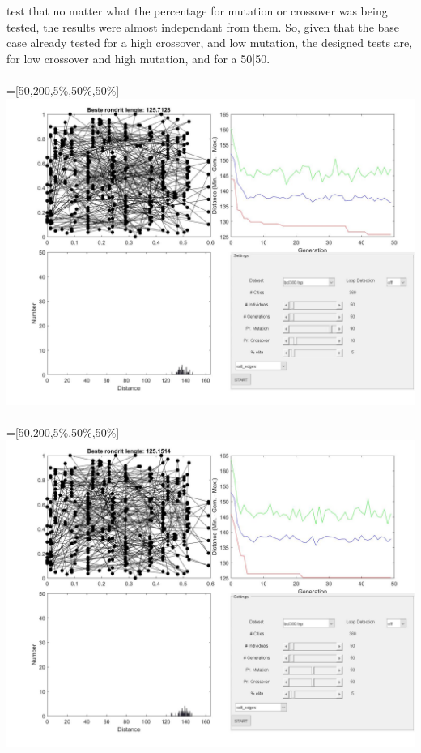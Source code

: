 test that no matter what the percentage for mutation or crossover was being
tested, the results were almost independant from them. So, given that the base
case already tested for a high crossover, and low mutation, the designed
tests are, for low crossover and high mutation, and for a 50|50. \\
\\
 =[50,200,5\%,50\%,50\%]\\
\includegraphics[width=\textwidth]{img/specific/order_crossover/general_6.jpg}\\
\\
 =[50,200,5\%,50\%,50\%]\\
\includegraphics[width=\textwidth]{img/specific/order_crossover/general_7.jpg}\\

